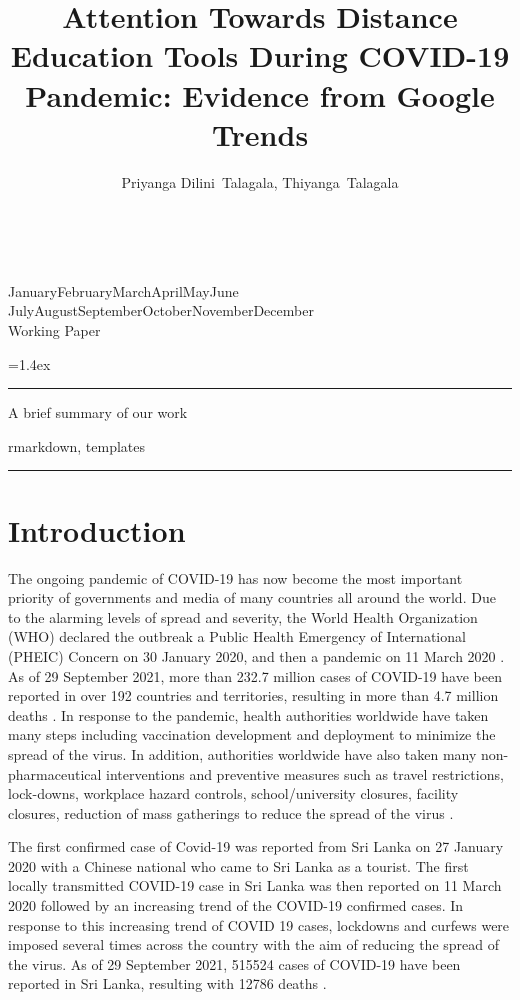 \documentclass[11pt,a4paper,]{article}
\title{Attention Towards Distance Education Tools During COVID-19 Pandemic: Evidence from Google Trends}
\author{Priyanga Dilini~Talagala, Thiyanga~Talagala}
\date{\sf\Date~\Month~\Year}
\makeatletter
\def\Date{\number\day}
\def\Month{\ifcase\month\or
 January\or February\or March\or April\or May\or June\or
 July\or August\or September\or October\or November\or December\fi}
\def\Year{\number\year}
\def\showjel{{\large\textsf{\textbf{JEL classification:}}~\@jel}}
\def\cover{{\sffamily\setcounter{page}{0}
        \thispagestyle{empty}
        \vspace*{2cm}
        \begin{center}
        \fbox{\parbox{14cm}{\begin{onehalfspace}\centering\Huge\vspace*{0.3cm}
                \textsf{\textbf{\expandafter{\@title}}}\vspace{1cm}\par
                \LARGE\@author\end{onehalfspace}
        }}
        \end{center}
        \vfill
                \begin{center}\Large
                \Month~\Year\\[1cm]
                Working Paper \@wp
        \end{center}\vspace*{2cm}}}
\def\pageone{{\sffamily\setstretch{1}%
        \thispagestyle{empty}%
        \vbox to \textheight{%
        \raggedright\baselineskip=1.2cm
     {\fontsize{24.88}{30}\sffamily\textbf{\expandafter{\@title}}}
        \vspace{2cm}\par
        \hspace{1cm}\parbox{14cm}{\sffamily\large\@addresses}\vspace{1cm}\vfill
        \hspace{1cm}{\large\Date~\Month~\Year}\\[1cm]
        \hspace{1cm}\showjel\vss}}}
\def\blindtitle{{\sffamily
     \thispagestyle{plain}\raggedright\baselineskip=1.2cm
     {\fontsize{24.88}{30}\sffamily\textbf{\expandafter{\@title}}}\vspace{1cm}\par
        }}
\def\titlepage{{\cover\newpage\pageone\newpage\blindtitle}}
\let\maketitle\titlepage
\newenvironment{keywords}{\par\vspace{0.5cm}\noindent{\sffamily\textbf{Keywords:}}}{\vspace{0.25cm}\par\hrule\vspace{0.5cm}\par}
\renewenvironment{abstract}{\begin{minipage}{\textwidth}\parskip=1.4ex\noindent
\hrule\vspace{0.1cm}\par{\sffamily\textbf{\abstractname}}\newline}
  {\end{minipage}}
\makeatother
\begin{document}
\maketitle
\begin{abstract}
A brief summary of our work
\end{abstract}
\begin{keywords}
rmarkdown, templates
\end{keywords}

\hypertarget{introduction}{%
\section{Introduction}\label{introduction}}

The ongoing pandemic of COVID-19 has now become the most important priority of governments and media of many countries all around the world. Due to the alarming levels of spread and severity, the World Health Organization (WHO) declared the outbreak a Public Health Emergency of International (PHEIC) Concern on 30 January 2020, and then a pandemic on 11 March 2020 \autocite{world2020timeline}. As of 29 September 2021, more than 232.7 million cases of COVID-19 have been reported in over 192 countries and territories, resulting in more than 4.7 million deaths \autocite{dong2020interactive}. In response to the pandemic, health authorities worldwide have taken many steps including vaccination development and deployment to minimize the spread of the virus. In addition, authorities worldwide have also taken many non-pharmaceutical interventions and preventive measures such as travel restrictions, lock-downs, workplace hazard controls, school/university closures, facility closures, reduction of mass gatherings to reduce the spread of the virus \autocite{chang2020modelling}.

The first confirmed case of Covid-19 was reported from Sri Lanka on 27 January 2020 with a Chinese national who came to Sri Lanka as a tourist. The first locally transmitted COVID-19 case in Sri Lanka was then reported on 11 March 2020 followed by an increasing trend of the COVID-19 confirmed cases. In response to this increasing trend of COVID 19 cases, lockdowns and curfews were imposed several times across the country with the aim of reducing the spread of the virus. As of 29 September 2021, 515524 cases of COVID-19 have been reported in Sri Lanka, resulting with 12786 deaths \autocite{HealthSL2020,dong2020interactive}.
\end{document}
